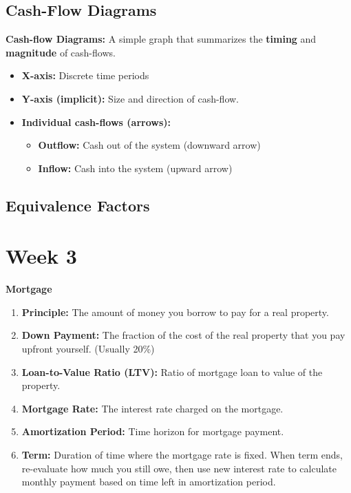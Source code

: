 \documentclass{article}
\begin{document}
    \subsection{Cash-Flow Diagrams}
        \begin{definition}
            \textbf{Cash-flow Diagrams:} A simple graph that summarizes the \textbf{timing} and \textbf{magnitude} of cash-flows.
            \begin{itemize}
                \item \textbf{X-axis:} Discrete time periods
                \item \textbf{Y-axis (implicit):} Size and direction of cash-flow.
                \item \textbf{Individual cash-flows (arrows):} 
                    \begin{itemize}
                        \item \textbf{Outflow:} Cash out of the system (downward arrow)
                        \item \textbf{Inflow:} Cash into the system (upward arrow)
                    \end{itemize}
            \end{itemize}
        \end{definition}
    
    \subsection{Equivalence Factors}
        
        

\section{Week 3}
    \begin{terminology}
        \textbf{Mortgage}
        \begin{enumerate}
            \item \textbf{Principle:} The amount of money you borrow to pay for a real property.
            \item \textbf{Down Payment:} The fraction of the cost of the real property that you pay upfront yourself. (Usually 20\%)
            \item \textbf{Loan-to-Value Ratio (LTV):} Ratio of mortgage loan to value of the property.
            \item \textbf{Mortgage Rate:} The interest rate charged on the mortgage. 
            \item \textbf{Amortization Period:} Time horizon for mortgage payment. 
            \item \textbf{Term:} Duration of time where the mortgage rate is fixed. When term ends, re-evaluate how much you still owe, then use new interest rate to calculate monthly payment based on time left in amortization period. 
        \end{enumerate}
    \end{terminology}
\end{document}
